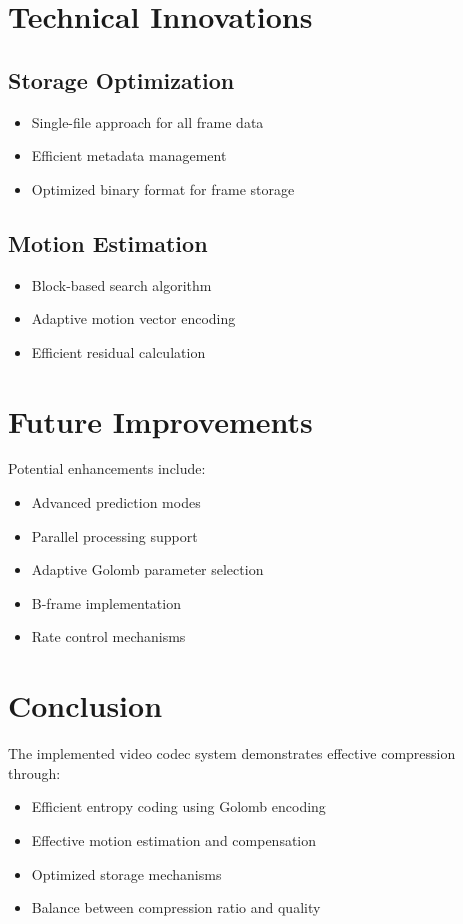 \documentclass[a4paper,14pt]{article}
\begin{document}
\section{Technical Innovations}

\subsection{Storage Optimization}
\begin{itemize}
    \item Single-file approach for all frame data
    \item Efficient metadata management
    \item Optimized binary format for frame storage
\end{itemize}

\subsection{Motion Estimation}
\begin{itemize}
    \item Block-based search algorithm
    \item Adaptive motion vector encoding
    \item Efficient residual calculation
\end{itemize}

\section{Future Improvements}
Potential enhancements include:
\begin{itemize}
    \item Advanced prediction modes
    \item Parallel processing support
    \item Adaptive Golomb parameter selection
    \item B-frame implementation
    \item Rate control mechanisms
\end{itemize}

\section{Conclusion}
The implemented video codec system demonstrates effective compression through:
\begin{itemize}
    \item Efficient entropy coding using Golomb encoding
    \item Effective motion estimation and compensation
    \item Optimized storage mechanisms
    \item Balance between compression ratio and quality
\end{itemize}
\end{document}
